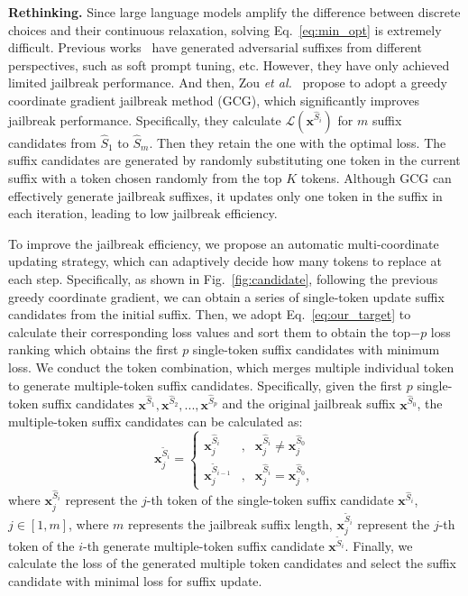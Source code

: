 \par \textbf{Rethinking.}  Since large language models amplify the difference between discrete choices and their continuous relaxation, solving Eq.~\ref{eq:min_opt} is extremely difficult. Previous works~\cite{shin2020autoprompt,guo2021gradient,wen2024hard} have generated adversarial suffixes from different perspectives, such as soft prompt tuning, etc. However, they have only achieved limited jailbreak performance. And then,  Zou \textit{et al.}~\cite{zou2023universal} propose to adopt a greedy coordinate gradient jailbreak method (GCG), which significantly improves jailbreak performance. Specifically, they calculate
$\mathcal{L}(\boldsymbol{x}^{\hat{S}_{i}})$ for $m$ suffix candidates from $\hat{S}_{1}$ to 
$\hat{S}_{m}$. Then they retain the one with the optimal loss. The suffix candidates are generated by randomly substituting one token in the current suffix with a token chosen randomly from the top $K$ tokens. Although GCG can effectively generate jailbreak suffixes, it updates only one token in the suffix in each iteration, leading to low jailbreak efficiency. 

\par To improve the jailbreak efficiency, we propose an automatic multi-coordinate updating strategy, which can adaptively decide how many tokens to replace at each step. Specifically, as shown in Fig.~\ref{fig:candidate}, following the previous greedy coordinate gradient, we can obtain a series of single-token update suffix candidates from the initial suffix. Then, we adopt Eq.~\ref{eq:our_target} to calculate their corresponding loss values and sort them to obtain the top$-p$ loss ranking which obtains the first $p$ single-token suffix candidates with minimum loss. 
We conduct the token combination, which merges multiple individual token to generate multiple-token suffix candidates. Specifically, given the first $p$ single-token suffix candidates $\boldsymbol{x}^{\hat{S}_{1}}, \boldsymbol{x}^{\hat{S}_{2}}, ..., \boldsymbol{x}^{\hat{S}_{p}}$ and the original jailbreak suffix $\boldsymbol{x}^{\hat{S}_{0}}$, the multiple-token suffix candidates can be calculated as:
\begin{equation}\label{eq2}
	\boldsymbol{x}_{j}^{\tilde{S}_{i}}=\left\{
	\begin{aligned}
		\boldsymbol{x}_{j}^{\hat{S}_{i}} & , & \boldsymbol{x}_{j}^{\hat{S}_{i}} \ne \boldsymbol{x}_{j}^{\hat{S}_{0}}\\
		\boldsymbol{x}_{j}^{\tilde{S}_{i-1}} & , & \boldsymbol{x}_{j}^{\hat{S}_{i}} = \boldsymbol{x}_{j}^{\hat{S}_{0}},
	\end{aligned}
	\right.
\end{equation}
where $\boldsymbol{x}_{j}^{\hat{S}_{i}}$ represent the $j$-th token of the single-token suffix candidate $\boldsymbol{x}^{\hat{S}_{i}}$, $j \in [1, m]$, where $m$ represents the jailbreak suffix length, $\boldsymbol{x}_{j}^{\tilde{S}_{i}}$ represent the $j$-th token of the $i$-th generate multiple-token suffix candidate $\boldsymbol{x}^{\tilde{S}_{i}}$. Finally, we calculate the loss of the generated multiple token candidates and select the suffix candidate with minimal loss for suffix update. 






